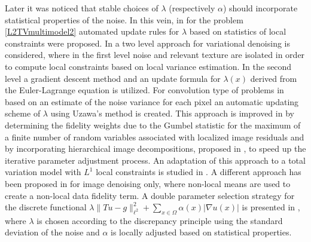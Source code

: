\documentclass[enabledeprecatedfontcommands,cleardoublepage=empty,headsepline,twoside,11pt,DIV=15,BCOR=12mm,final]{scrartcl}
\begin{document}
Later it was noticed that stable choices of $\lambda$ (respectively $\alpha$) should incorporate statistical properties of the noise. In this vein, in \cite{AlBaCaHa:08, DoHiRi:11, GiSoZe:03} for the problem \eqref{L2TVmultimodel2} automated update rules for $\lambda$ based on statistics of local constraints were proposed. In \cite{GiSoZe:03} a two level approach for variational denoising is considered, where in the first level noise and relevant texture are isolated in order to compute local constraints based on local variance estimation. In the second level a gradient descent method and an update formula for $\lambda(x)$ derived from the Euler-Lagrange equation is utilized. For convolution type of problems in \cite{AlBaCaHa:08} based on an estimate of the noise variance for each pixel an automatic updating scheme of $\lambda$ using Uzawa's method is created. This approach is improved in \cite{DoHiRi:11} by determining the fidelity weights due to the Gumbel statistic for the maximum of a finite number of random variables associated with localized image residuals and by incorporating hierarchical image decompositions, proposed in \cite{TaNeVe:04,TaNeVe:08}, to speed up the iterative parameter adjustment process. An adaptation of this approach to a total variation model with $L^1$ local constraints is studied in \cite{HintermullerRincon-Camacho:10}. A different approach has been proposed in \cite{SuDeAu:14} for image denoising only, where non-local means \cite{BuCoMo:05} are used to create a non-local data fidelity term. %
A double parameter selection strategy for the discrete functional $\lambda \|T u - g\|_{\ell^2}^2 + \sum_{x\in \Omega} \alpha(x) |\nabla u(x)|$ is presented in \cite{CaLaPrSg:19}, where $\lambda$ is chosen according to the discrepancy principle using the standard deviation of the noise and $\alpha$ is locally adjusted based on statistical properties.
\end{document}
